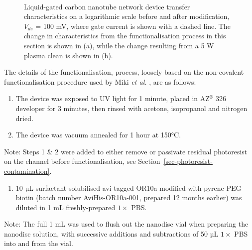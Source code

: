 \documentclass[
  a4paper,
]{scrbook}
\providecommand{\tightlist}{%
  \setlength{\itemsep}{0pt}\setlength{\parskip}{0pt}}\usepackage{longtable,booktabs,array}
\begin{document}
\begin{figure}
\begin{minipage}[t]{0.45\linewidth}
{{}

}

\end{minipage}%
%
\begin{minipage}[t]{0.01\linewidth}

{\centering 

~

}

\end{minipage}%

\caption{\label{fig-OR10a-TX-comparison}Liquid-gated carbon nanotube
network device transfer characteristics on a logarithmic scale before
and after modification, \(V_{ds}\) = 100 mV, where gate current is shown
with a dashed line. The change in characteristics from the
functionalisation process in this section is shown in (a), while the
change resulting from a 5 W plasma clean is shown in (b).}

\end{figure}

The details of the functionalisation, process, loosely based on the
non-covalent functionalisation procedure used by Miki \emph{et al.}
\autocite{Miki2019}, are as follows:

\begin{enumerate}
\def\labelenumi{\arabic{enumi}.}
\item
  The device was exposed to UV light for 1 minute, placed in
  AZ\(^\circledR\) 326 developer for 3 minutes, then rinsed with
  acetone, isopropanol and nitrogen dried.
\item
  The device was vacuum annealed for 1 hour at 150°C.
\end{enumerate}

Note: Steps 1 \& 2 were added to either remove or passivate residual
photoresist on the channel before functionalisation, see
Section~\ref{sec-photoresist-contamination}.

\begin{enumerate}
\def\labelenumi{\arabic{enumi}.}
\setcounter{enumi}{2}
\tightlist
\item
  10 µL surfactant-solubilised avi-tagged OR10a modified with
  pyrene-PEG-biotin (batch number AviHis-OR10a-001, prepared 12 months
  earlier) was diluted in 1 mL freshly-prepared \(1 \times\) PBS.
\end{enumerate}

Note: The full 1 mL was used to flush out the nanodisc vial when
preparing the nanodisc solution, with successive additions and
subtractions of 50 µL \(1 \times\) PBS into and from the vial.
\end{document}

